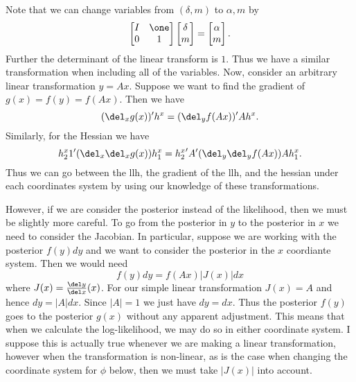 \documentclass[]{article}
\begin{document}
Note that we can change variables from $(\delta, m)$ to $\alpha, m$ by
\[
\begin{bmatrix}
I & \one \\
0 & 1
\end{bmatrix}
\begin{bmatrix}
\delta \\ m
\end{bmatrix}
= 
\begin{bmatrix}
\alpha \\ m
\end{bmatrix}.
\]
Further the determinant of the linear transform is $1$.  Thus we have a similar
transformation when including all of the variables.  Now, consider an arbitrary
linear transformation $y = A x$.  Suppose we want to find the gradient of $g(x)
= f(y) = f(A x)$.  Then we have
\[
(\del_x g(x))' h^{x} = (\del_y f(Ax))' A h^{x}.
\]
Similarly, for the Hessian we have
\[
{h^x_2}1' (\del_x \del_x g(x)) h^x_1 = {h^{x}_2}' A' (\del_y \del_y f(Ax)) A h^{x}_1.
\]
Thus we can go between the llh, the gradient of the llh, and the hessian under
each coordinates system by using our knowledge of these transformations.

However, if we are consider the posterior instead of the likelihood, then we
must be slightly more careful.  To go from the posterior in $y$ to the posterior
in $x$ we need to consider the Jacobian.  In particular, suppose we are working
with the posterior $f(y) dy$ and we want to consider the posterior in the $x$
coordiante system.  Then we would need 
\[
f(y) dy = f(Ax) |J(x)| dx
\]
where $J(x) = \frac{\del y}{\del x}(x)$.  For our simple linear transformation
$J(x) = A$ and hence $dy = |A| dx$.  Since $|A|=1$ we just have $dy = dx$.  Thus
the posterior $f(y)$ goes to the posterior $g(x)$ without any apparent
adjustment.  This means that when we calculate the log-likelihood, we may do so
in either coordinate system.  I suppose this is actually true whenever we are
making a linear transformation, however when the transformation is non-linear,
as is the case when changing the coordinate system for $\phi$ below, then we
must take $|J(x)|$ into account.
\end{document}
